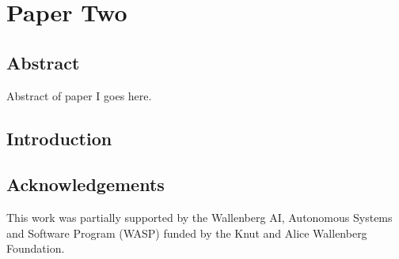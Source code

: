 

\chapter[Paper Two]{\texorpdfstring{%
Paper Two}{%
Paper Two}}

\paperRemark{\paperIIref}




\section*{Abstract}
Abstract of paper I goes here.



\section{Introduction}
\label{sec:introduction}




\section*{Acknowledgements}

This work was partially supported by the Wallenberg AI, Autonomous Systems and Software Program (WASP) funded by the Knut and Alice Wallenberg Foundation.

{\raggedright
\printbibliography[segment=\therefsegment,heading=subbibliography]
}
